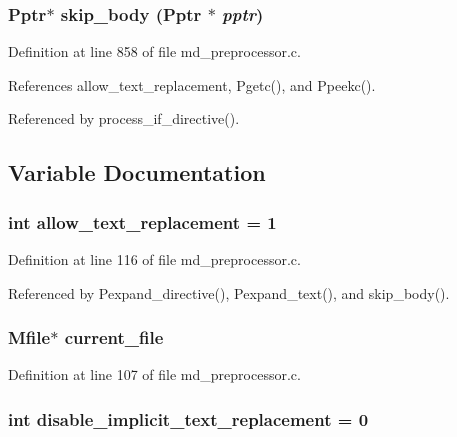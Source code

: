 \subsubsection{\setlength{\rightskip}{0pt plus 5cm}\bf{Pptr}$\ast$ skip\_\-body (\bf{Pptr} $\ast$ {\em pptr})}\label{md__preprocessor_8c_29c698ea791dfee82424f8393cf5d814}




Definition at line 858 of file md\_\-preprocessor.c.

References allow\_\-text\_\-replacement, Pgetc(), and Ppeekc().

Referenced by process\_\-if\_\-directive().

\subsection{Variable Documentation}
\subsubsection{\setlength{\rightskip}{0pt plus 5cm}int \bf{allow\_\-text\_\-replacement} = 1}\label{md__preprocessor_8c_ec53c8fb29375671fc5e7ab14c42371e}




Definition at line 116 of file md\_\-preprocessor.c.

Referenced by Pexpand\_\-directive(), Pexpand\_\-text(), and skip\_\-body().
\subsubsection{\setlength{\rightskip}{0pt plus 5cm}\bf{Mfile}$\ast$ \bf{current\_\-file}}\label{md__preprocessor_8c_e691226eaa6fb3edc17ff2d541e1ce55}




Definition at line 107 of file md\_\-preprocessor.c.
\subsubsection{\setlength{\rightskip}{0pt plus 5cm}int \bf{disable\_\-implicit\_\-text\_\-replacement} = 0}\label{md__preprocessor_8c_05d4fa71ca0b0662c39ceab758ce15d4}




